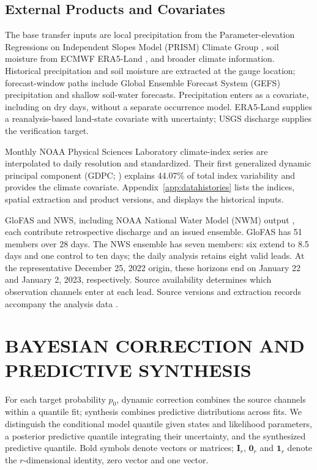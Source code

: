 \documentclass[APA,STIX1COL]{WileyNJD-v2}
\begin{document}
\subsection{External Products and Covariates}

The base transfer inputs are local precipitation from the Parameter-elevation Regressions on Independent Slopes Model (PRISM) Climate Group \citep{prism}, soil moisture from ECMWF ERA5-Land \citep{ecmwf,munozsabater2021era5land}, and broader climate information. Historical precipitation and soil moisture are extracted at the gauge location; forecast-window paths include Global Ensemble Forecast System (GEFS) precipitation and shallow soil-water forecasts. Precipitation enters as a covariate, including on dry days, without a separate occurrence model. ERA5-Land supplies a reanalysis-based land-state covariate with uncertainty; USGS discharge supplies the verification target.

Monthly NOAA Physical Sciences Laboratory climate-index series \citep{noaa_climate_indices} are interpolated to daily resolution and standardized. Their first generalized dynamic principal component (GDPC; \citealp{JSSv092c02}) explains 44.07\% of total index variability and provides the climate covariate. Appendix~\ref{app:datahistories} lists the indices, spatial extraction and product versions, and displays the historical inputs.

GloFAS \citep{harrigan2020glofas} and NWS, including NOAA National Water Model (NWM) output \citep{cosgrove2024noaa}, each contribute retrospective discharge and an issued ensemble. GloFAS has 51 members over 28 days. The NWS ensemble has seven members: six extend to 8.5 days and one control to ten days; the daily analysis retains eight valid leads. At the representative December 25, 2022 origin, these horizons end on January 22 and January 2, 2023, respectively. Source availability determines which observation channels enter at each lead. Source versions and extraction records accompany the analysis data \citep{deleon2026sanlorenzo_reproducibility}.
\section{BAYESIAN CORRECTION AND PREDICTIVE SYNTHESIS}
\label{sec:methodology}

For each target probability $p_0$, dynamic correction combines the source channels within a quantile fit; synthesis combines predictive distributions across fits. We distinguish the conditional model quantile given states and likelihood parameters, a posterior predictive quantile integrating their uncertainty, and the synthesized predictive quantile. Bold symbols denote vectors or matrices; $\mathbf I_r$, $\mathbf 0_r$ and $\mathbf 1_r$ denote the $r$-dimensional identity, zero vector and one vector.
\end{document}
